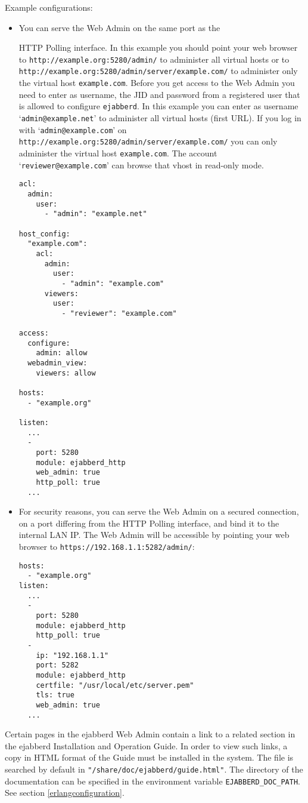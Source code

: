 \documentclass[a4paper,10pt]{book}
\newcommand{\ind}[1]{\begin{latexonly}\index{#1}\end{latexonly}}
\newcommand{\jid}[1]{\texttt{#1}}
\newcommand{\term}[1]{\texttt{#1}}
\newcommand{\ejabberd}{\texttt{ejabberd}}
\begin{document}
Example configurations:
\begin{itemize}
\item You can serve the Web Admin on the same port as the
  \ind{protocols!XEP-0025: HTTP Polling}HTTP Polling interface. In this example
  you should point your web browser to \verb|http://example.org:5280/admin/| to
  administer all virtual hosts or to
  \verb|http://example.org:5280/admin/server/example.com/| to administer only
  the virtual host \jid{example.com}. Before you get access to the Web Admin
  you need to enter as username, the JID and password from a registered user
  that is allowed to configure \ejabberd{}. In this example you can enter as
  username `\jid{admin@example.net}' to administer all virtual hosts (first
  URL). If you log in with `\jid{admin@example.com}' on \\
  \verb|http://example.org:5280/admin/server/example.com/| you can only
  administer the virtual host \jid{example.com}.
  The account `\jid{reviewer@example.com}' can browse that vhost in read-only mode.
\begin{verbatim}
acl: 
  admin: 
    user: 
      - "admin": "example.net"

host_config: 
  "example.com": 
    acl: 
      admin: 
        user: 
          - "admin": "example.com"
      viewers: 
        user: 
          - "reviewer": "example.com"

access: 
  configure: 
    admin: allow
  webadmin_view: 
    viewers: allow

hosts: 
  - "example.org"

listen: 
  ...
  - 
    port: 5280
    module: ejabberd_http
    web_admin: true
    http_poll: true
  ...
\end{verbatim}
\item For security reasons, you can serve the Web Admin on a secured
  connection, on a port differing from the HTTP Polling interface, and bind it
  to the internal LAN IP. The Web Admin will be accessible by pointing your
  web browser to \verb|https://192.168.1.1:5282/admin/|:
\begin{verbatim}
hosts: 
  - "example.org"
listen: 
  ...
  - 
    port: 5280
    module: ejabberd_http
    http_poll: true
  - 
    ip: "192.168.1.1"
    port: 5282
    module: ejabberd_http
    certfile: "/usr/local/etc/server.pem"
    tls: true
    web_admin: true
  ...
\end{verbatim}
\end{itemize}

Certain pages in the ejabberd Web Admin contain a link to a related
section in the ejabberd Installation and Operation Guide.
In order to view such links, a copy in HTML format of the Guide must
be installed in the system.
The file is searched by default in
\term{"/share/doc/ejabberd/guide.html"}.
The directory of the documentation can be specified in
the environment variable \term{EJABBERD\_DOC\_PATH}.
See section \ref{erlangconfiguration}.
\end{document}

